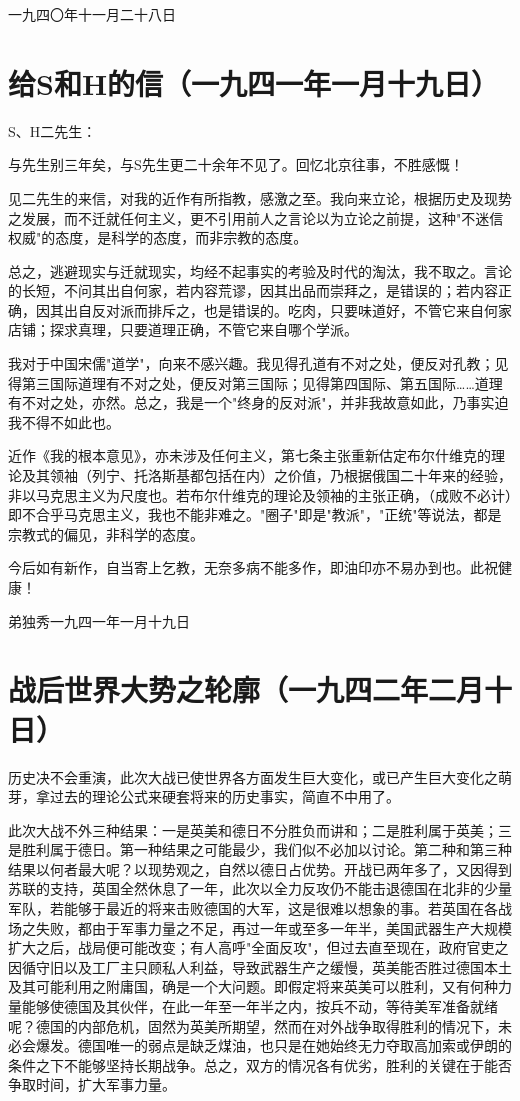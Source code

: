 \documentclass[
  openany,           %
  12pt,              %
  a4paper            %
]{ctexbook}
\begin{document}
\hfill 一九四〇年十一月二十八日

\chapter{给S和H的信（一九四一年一月十九日）}

\quad\quad S、H二先生：

与先生别三年矣，与S先生更二十余年不见了。回忆北京往事，不胜感慨！

见二先生的来信，对我的近作有所指教，感激之至。我向来立论，根据历史及现势之发展，而不迁就任何主义，更不引用前人之言论以为立论之前提，这种"不迷信权威"的态度，是科学的态度，而非宗教的态度。

总之，逃避现实与迁就现实，均经不起事实的考验及时代的淘汰，我不取之。言论的长短，不问其出自何家，若内容荒谬，因其出品而崇拜之，是错误的；若内容正确，因其出自反对派而排斥之，也是错误的。吃肉，只要味道好，不管它来自何家店铺；探求真理，只要道理正确，不管它来自哪个学派。

我对于中国宋儒"道学"，向来不感兴趣。我见得孔道有不对之处，便反对孔教；见得第三国际道理有不对之处，便反对第三国际；见得第四国际、第五国际……道理有不对之处，亦然。总之，我是一个"终身的反对派"，并非我故意如此，乃事实迫我不得不如此也。

近作《我的根本意见》，亦未涉及任何主义，第七条主张重新估定布尔什维克的理论及其领袖（列宁、托洛斯基都包括在内）之价值，乃根据俄国二十年来的经验，非以马克思主义为尺度也。若布尔什维克的理论及领袖的主张正确，（成败不必计）即不合乎马克思主义，我也不能非难之。"圈子"即是"教派"，"正统"等说法，都是宗教式的偏见，非科学的态度。

今后如有新作，自当寄上乞教，无奈多病不能多作，即油印亦不易办到也。此祝健康！

\hfill 弟独秀\quad 一九四一年一月十九日

\chapter{战后世界大势之轮廓（一九四二年二月十日）}

\quad\quad 历史决不会重演，此次大战已使世界各方面发生巨大变化，或已产生巨大变化之萌芽，拿过去的理论公式来硬套将来的历史事实，简直不中用了。

此次大战不外三种结果：一是英美和德日不分胜负而讲和；二是胜利属于英美；三是胜利属于德日。第一种结果之可能最少，我们似不必加以讨论。第二种和第三种结果以何者最大呢？以现势观之，自然以德日占优势。开战已两年多了，又因得到苏联的支持，英国全然休息了一年，此次以全力反攻仍不能击退德国在北非的少量军队，若能够于最近的将来击败德国的大军，这是很难以想象的事。若英国在各战场之失败，都由于军事力量之不足，再过一年或至多一年半，美国武器生产大规模扩大之后，战局便可能改变；有人高呼"全面反攻"，但过去直至现在，政府官吏之因循守旧以及工厂主只顾私人利益，导致武器生产之缓慢，英美能否胜过德国本土及其可能利用之附庸国，确是一个大问题。即假定将来英美可以胜利，又有何种力量能够使德国及其伙伴，在此一年至一年半之内，按兵不动，等待美军准备就绪呢？德国的内部危机，固然为英美所期望，然而在对外战争取得胜利的情况下，未必会爆发。德国唯一的弱点是缺乏煤油，也只是在她始终无力夺取高加索或伊朗的条件之下不能够坚持长期战争。总之，双方的情况各有优劣，胜利的关键在于能否争取时间，扩大军事力量。
\end{document}
